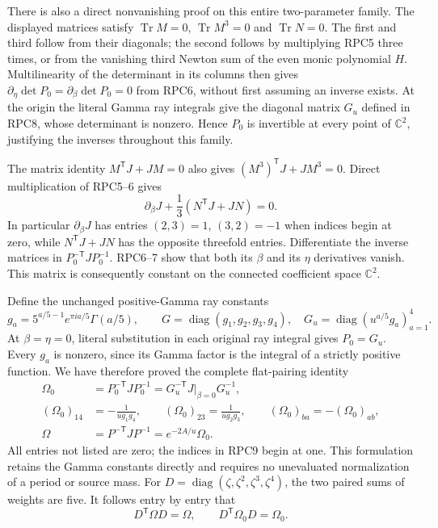 \documentclass[11pt,a4paper]{article}
\begin{document}
There is also a direct nonvanishing proof on this entire two-parameter
family. The displayed matrices satisfy $\operatorname{Tr}M=0$,
$\operatorname{Tr}M^3=0$ and $\operatorname{Tr}N=0$. The first and
third follow from their diagonals; the second follows by multiplying
RPC5 three times, or from the vanishing third Newton sum of the even
monic polynomial $H$. Multilinearity of the determinant in its columns
then gives $\partial_\eta\det P_0=\partial_\beta\det P_0=0$ from
RPC6, without first assuming an inverse exists. At the origin the
literal Gamma ray integrals give the diagonal matrix $G_u$ defined in
RPC8, whose determinant is nonzero. Hence $P_0$ is invertible at every
point of $\mathbb C^2$, justifying the inverses throughout this family.

The matrix identity $M^{\mathsf T}J+JM=0$ also gives
$(M^3)^{\mathsf T}J+JM^3=0$. Direct multiplication of RPC5--6 gives
\[
 \partial_\beta J+\frac13(N^{\mathsf T}J+JN)=0.
 \tag{RPC7}
\]
In particular $\partial_\beta J$ has entries $(2,3)=1$, $(3,2)=-1$
when indices begin at zero, while $N^{\mathsf T}J+JN$ has the
opposite threefold entries. Differentiate the inverse matrices in
$P_0^{-\mathsf T}JP_0^{-1}$. RPC6--7 show that both its $\beta$ and
its $\eta$ derivatives vanish. This matrix is consequently constant
on the connected coefficient space $\mathbb C^2$.

Define the unchanged positive-Gamma ray constants
\[
 g_a=5^{a/5-1}e^{\pi ia/5}\Gamma(a/5),\qquad
 G=\operatorname{diag}(g_1,g_2,g_3,g_4),\quad
 G_u=\operatorname{diag}(u^{a/5}g_a)_{a=1}^4.
 \tag{RPC8}
\]
At $\beta=\eta=0$, literal substitution in each original ray integral
gives $P_0=G_u$. Every $g_a$ is nonzero, since its Gamma factor is
the integral of a strictly positive function. We have therefore proved
the complete flat-pairing identity
\[
 \begin{split}
 \Omega_0&=P_0^{-\mathsf T}JP_0^{-1}
       =G_u^{-\mathsf T}J\big|_{\beta=0}G_u^{-1},\\
 (\Omega_0)_{14}&=-\frac1{u g_1g_4},\qquad
 (\Omega_0)_{23}=\frac1{u g_2g_3},\qquad
 (\Omega_0)_{ba}=-(\Omega_0)_{ab},\\
 \Omega&=P^{-\mathsf T}JP^{-1}=e^{-2A/u}\Omega_0.
 \end{split}
 \tag{RPC9}
\]
All entries not listed are zero; the indices in RPC9 begin at one.
This formulation retains the Gamma constants directly and requires
no unevaluated normalization of a period or source mass. For
$D=\operatorname{diag}(\zeta,\zeta^2,\zeta^3,\zeta^4)$, the two
paired sums of weights are five. It follows entry by entry that
\[
 D^{\mathsf T}\Omega D=\Omega,
 \qquad D^{\mathsf T}\Omega_0D=\Omega_0.
 \tag{RPC10}
\]
\end{document}
